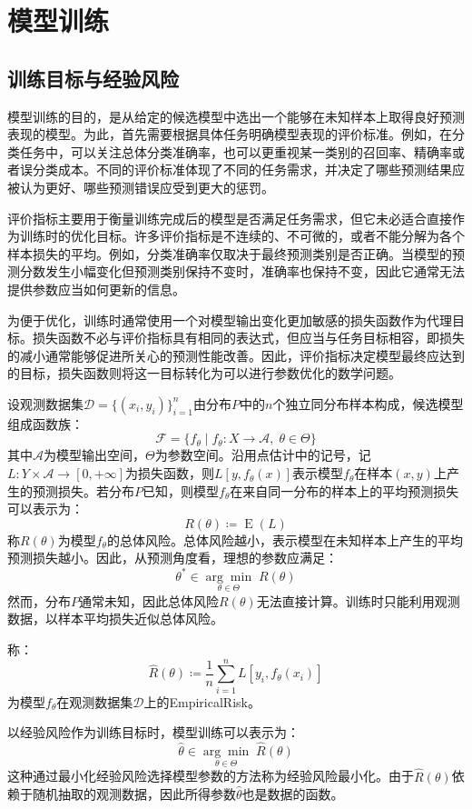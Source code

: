\section{模型训练}

\subsection{训练目标与经验风险}
模型训练的目的，是从给定的候选模型中选出一个能够在未知样本上取得良好预测表现的模型。为此，首先需要根据具体任务明确模型表现的评价标准。例如，在分类任务中，可以关注总体分类准确率，也可以更重视某一类别的召回率、精确率或者误分类成本。不同的评价标准体现了不同的任务需求，并决定了哪些预测结果应被认为更好、哪些预测错误应受到更大的惩罚。\par
评价指标主要用于衡量训练完成后的模型是否满足任务需求，但它未必适合直接作为训练时的优化目标。许多评价指标是不连续的、不可微的，或者不能分解为各个样本损失的平均。例如，分类准确率仅取决于最终预测类别是否正确。当模型的预测分数发生小幅变化但预测类别保持不变时，准确率也保持不变，因此它通常无法提供参数应当如何更新的信息。\par
为便于优化，训练时通常使用一个对模型输出变化更加敏感的损失函数作为代理目标。损失函数不必与评价指标具有相同的表达式，但应当与任务目标相容，即损失的减小通常能够促进所关心的预测性能改善。因此，评价指标决定模型最终应达到的目标，损失函数则将这一目标转化为可以进行参数优化的数学问题。\par
设观测数据集$\mathcal{D}=\{(x_i,y_i)\}_{i=1}^{n}$由分布$P$中的$n$个独立同分布样本构成，候选模型组成函数族：
\begin{equation*}
	\mathcal{F}=\{f_\theta\mid f_\theta:X\to\mathcal{A},\;\theta\in\Theta\}
\end{equation*}
其中$\mathcal{A}$为模型输出空间，$\Theta$为参数空间。沿用点估计中的记号，记$L:Y\times\mathcal{A}\to[0,+\infty]$为损失函数，则$L[y,f_\theta(x)]$表示模型$f_\theta$在样本$(x,y)$上产生的预测损失。若分布$P$已知，则模型$f_\theta$在来自同一分布的样本上的平均预测损失可以表示为：
\begin{equation*}
	R(\theta)\coloneq\operatorname{E}(L)
\end{equation*}
称$R(\theta)$为模型$f_\theta$的总体风险。总体风险越小，表示模型在未知样本上产生的平均预测损失越小。因此，从预测角度看，理想的参数应满足：
\begin{equation*}
	\theta^\ast\in\underset{\theta\in\Theta}{\arg\min}\;R(\theta)
\end{equation*}
然而，分布$P$通常未知，因此总体风险$R(\theta)$无法直接计算。训练时只能利用观测数据，以样本平均损失近似总体风险。
\begin{definition}
	称：
	\begin{equation*}
		\hat{R}(\theta)\coloneq\frac{1}{n}\sum_{i=1}^{n}L[y_i,f_\theta(x_i)]
	\end{equation*}
	为模型$f_\theta$在观测数据集$\mathcal{D}$上的\gls{EmpiricalRisk}。
\end{definition}
以经验风险作为训练目标时，模型训练可以表示为：
\begin{equation*}
	\hat{\theta}\in\underset{\theta\in\Theta}{\arg\min}\;\hat{R}(\theta)
\end{equation*}
这种通过最小化经验风险选择模型参数的方法称为经验风险最小化。由于$\hat{R}(\theta)$依赖于随机抽取的观测数据，因此所得参数$\hat{\theta}$也是数据的函数。
